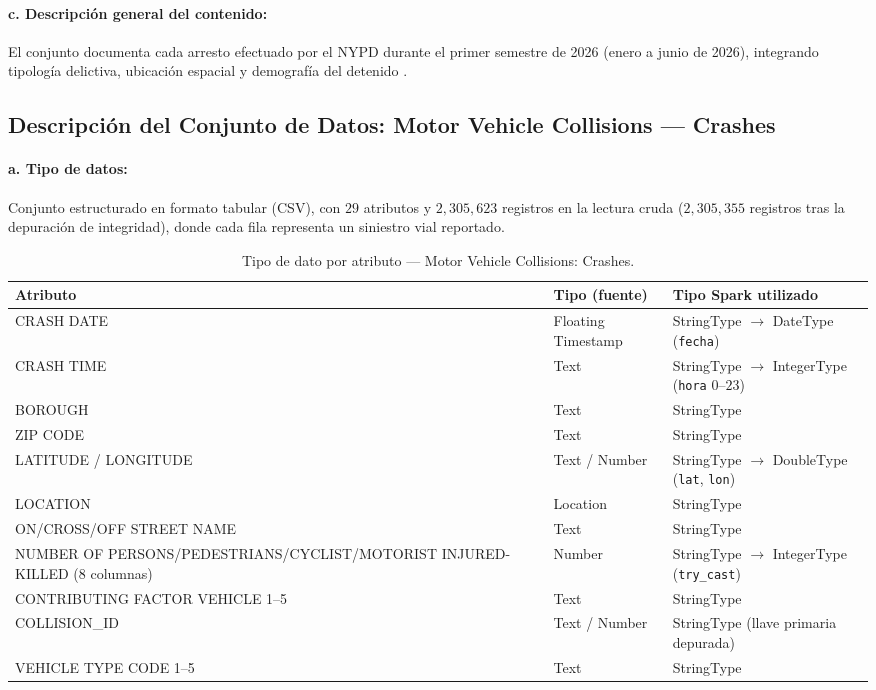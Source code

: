 \documentclass[11pt,a4paper]{article}
\begin{document}
\paragraph{c. Descripción general del contenido:} El conjunto documenta cada arresto efectuado por el NYPD durante el primer semestre de 2026 (enero a junio de 2026), integrando tipología delictiva, ubicación espacial y demografía del detenido \cite{nypd_arrests_ytd_2026}.

\subsection{Descripción del Conjunto de Datos: Motor Vehicle Collisions --- Crashes}
\label{subsec:desc_collisions}

\paragraph{a. Tipo de datos:} Conjunto estructurado en formato tabular (CSV), con $29$ atributos y $2,305,623$ registros en la lectura cruda ($2,305,355$ registros tras la depuración de integridad), donde cada fila representa un siniestro vial reportado.

\begin{table}[H]
\centering
\small
\caption{Tipo de dato por atributo --- Motor Vehicle Collisions: Crashes.}
\label{tab:tipos_collisions}
\begin{tabularx}{\linewidth}{X l l}
\toprule
\textbf{Atributo} & \textbf{Tipo (fuente)} & \textbf{Tipo Spark utilizado} \\
\midrule
CRASH DATE & Floating Timestamp & StringType $\rightarrow$ DateType (\texttt{fecha}) \\
CRASH TIME & Text & StringType $\rightarrow$ IntegerType (\texttt{hora} $0\text{--}23$) \\
BOROUGH & Text & StringType \\
ZIP CODE & Text & StringType \\
LATITUDE / LONGITUDE & Text / Number & StringType $\rightarrow$ DoubleType (\texttt{lat}, \texttt{lon}) \\
LOCATION & Location & StringType \\
ON/CROSS/OFF STREET NAME & Text & StringType \\
NUMBER OF PERSONS/PEDESTRIANS/CYCLIST/MOTORIST INJURED-KILLED (8 columnas) & Number & StringType $\rightarrow$ IntegerType (\texttt{try\_cast}) \\
CONTRIBUTING FACTOR VEHICLE 1--5 & Text & StringType \\
COLLISION\_ID & Text / Number & StringType (llave primaria depurada) \\
VEHICLE TYPE CODE 1--5 & Text & StringType \\
\bottomrule
\end{tabularx}
\end{table}
\end{document}
